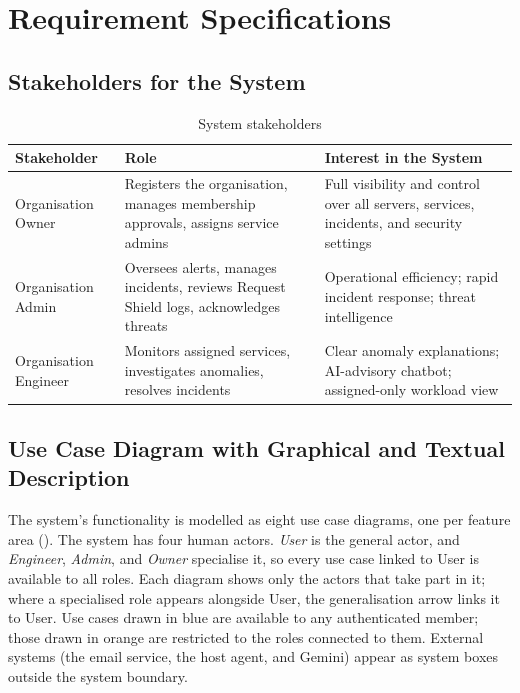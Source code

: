 \chapter{Requirement Specifications}\label{ch:req}

\section{Stakeholders for the System}

\begin{table}[H]
\centering
\caption{System stakeholders}\label{tab:stakeholders}
\begin{tabularx}{\textwidth}{@{}l X X@{}}
\toprule
\textbf{Stakeholder} & \textbf{Role} & \textbf{Interest in the System}\\
\midrule
Organisation Owner &
  Registers the organisation, manages membership approvals, assigns service admins &
  Full visibility and control over all servers, services, incidents, and security settings\\
Organisation Admin &
  Oversees alerts, manages incidents, reviews Request Shield logs, acknowledges threats &
  Operational efficiency; rapid incident response; threat intelligence\\
Organisation Engineer &
  Monitors assigned services, investigates anomalies, resolves incidents &
  Clear anomaly explanations; AI-advisory chatbot; assigned-only workload view\\
\bottomrule
\end{tabularx}
\end{table}

\section{Use Case Diagram with Graphical and Textual Description}

The system's functionality is modelled as eight use case diagrams, one per
feature area ().
The system has four human actors.  \textit{User} is the general actor, and
\textit{Engineer}, \textit{Admin}, and \textit{Owner} specialise it, so every
use case linked to User is available to all roles.  Each diagram shows only
the actors that take part in it; where a specialised role appears alongside
User, the generalisation arrow links it to User.  Use cases drawn in blue are available to any
authenticated member; those drawn in orange are restricted to the roles
connected to them.  External systems (the email service, the host agent, and
Gemini) appear as \guillemotleft system\guillemotright{} boxes outside the
system boundary.

